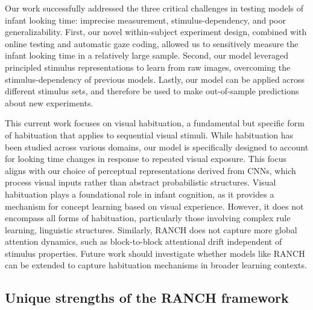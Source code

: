 \documentclass[
]{article}
\begin{document}
Our work successfully addressed the three critical challenges in testing models of infant looking time: imprecise measurement, stimulus-dependency, and poor generalizability. First, our novel within-subject experiment design, combined with online testing and automatic gaze coding, allowed us to sensitively measure the infant looking time in a relatively large sample. Second, our model leveraged principled stimulus representations to learn from raw images, overcoming the stimulus-dependency of previous models. Lastly, our model can be applied across different stimulus sets, and therefore be used to make out-of-sample predictions about new experiments. 

This current work focuses on visual habituation, a fundamental but specific form of habituation that applies to sequential visual stimuli. While habituation has been studied across various domains, our model is specifically designed to account for looking time changes in response to repeated visual exposure. This focus aligns with our choice of perceptual representations derived from CNNs, which process visual inputs rather than abstract probabilistic structures. Visual habituation plays a foundational role in infant cognition, as it provides a mechanism for concept learning based on visual experience. However, it does not encompass all forms of habituation, particularly those involving complex rule learning, linguistic structures. Similarly, RANCH does not capture more global attention dynamics, such as block-to-block attentional drift independent of stimulus properties. Future work should investigate whether models like RANCH can be extended to capture habituation mechanisms in broader learning contexts.


\hypertarget{unique-strengths-of-ranch-framework}{%
\subsection{Unique strengths of the RANCH framework}\label{unique-strengths-of-ranch-framework}}
\end{document}
